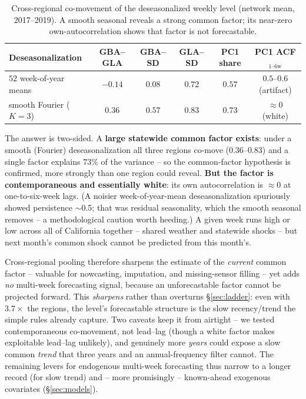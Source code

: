 \documentclass[11pt]{article}
\begin{document}
\begin{table}[H]\centering
\caption{Cross-regional co-movement of the deseasonalized weekly level (network
mean, 2017--2019). A smooth seasonal reveals a strong common factor; its near-zero
own-autocorrelation shows that factor is not forecastable.}
\label{tab:comove}
\begin{tabular}{lccccc}
\toprule
Deseasonalization & GBA--GLA & GBA--SD & GLA--SD & PC1 share & PC1 ACF$_{1\text{--}6\text{w}}$ \\
\midrule
$52$ week-of-year means   & $-0.14$ & $0.08$ & $0.72$ & $0.57$ & $0.5$--$0.6$ (artifact) \\
smooth Fourier ($K{=}3$)  & $0.36$  & $0.57$ & $0.83$ & $0.73$ & $\approx 0$ (white) \\
\bottomrule
\end{tabular}
\end{table}

The answer is two-sided. A \textbf{large statewide common factor exists}: under a
smooth (Fourier) deseasonalization all three regions co-move ($0.36$--$0.83$) and a
single factor explains $73\%$ of the variance -- so the common-factor hypothesis is
confirmed, more strongly than one region could reveal. \textbf{But the factor is
contemporaneous and essentially white}: its own autocorrelation is $\approx 0$ at
one-to-six-week lags. (A noisier week-of-year-mean deseasonalization spuriously
showed persistence $\sim$0.5; that was residual seasonality, which the smooth
seasonal removes -- a methodological caution worth heeding.) A given week runs high
or low across all of California together -- shared weather and statewide shocks --
but next month's common shock cannot be predicted from this month's.

Cross-regional pooling therefore sharpens the estimate of the \emph{current} common
factor -- valuable for nowcasting, imputation, and missing-sensor filling -- yet
adds \emph{no} multi-week forecasting signal, because an unforecastable factor
cannot be projected forward. This \emph{sharpens} rather than overturns
\S\ref{sec:ladder}: even with $3.7\times$ the regions, the level's forecastable
structure is the slow recency/trend the simple rules already capture. Two caveats
keep it from airtight -- we tested contemporaneous co-movement, not lead--lag
(though a white factor makes exploitable lead--lag unlikely), and genuinely more
\emph{years} could expose a slow common \emph{trend} that three years and an
annual-frequency filter cannot. The remaining levers for endogenous multi-week
forecasting thus narrow to a longer record (for slow trend) and -- more
promisingly -- known-ahead exogenous covariates (\S\ref{sec:models}).
\end{document}
